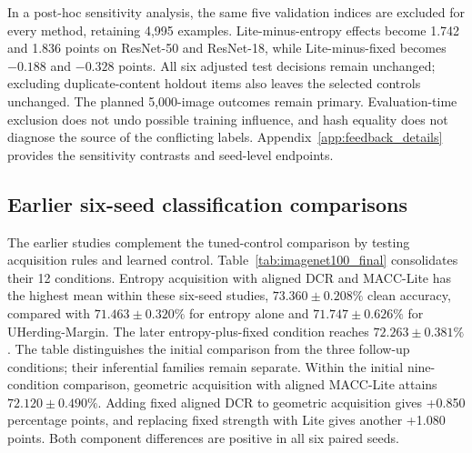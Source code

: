\documentclass[10pt,a4paper,twocolumn]{article}
\begin{document}
In a post-hoc sensitivity analysis, the same five validation indices
are excluded for every method, retaining 4,995 examples. Lite-minus-entropy
effects become 1.742 and 1.836 points on ResNet-50 and ResNet-18, while
Lite-minus-fixed becomes $-0.188$ and $-0.328$ points. All six adjusted
test decisions remain unchanged; excluding duplicate-content holdout
items also leaves the selected controls unchanged. The planned
5,000-image outcomes remain primary. Evaluation-time exclusion does not
undo possible training influence, and hash equality does not diagnose
the source of the conflicting labels. Appendix~\ref{app:feedback_details}
provides the sensitivity contrasts and seed-level endpoints.

\subsection{Earlier six-seed classification comparisons}\label{sec:initial_results}

The earlier studies complement the tuned-control comparison by testing
acquisition rules and learned control. Table~\ref{tab:imagenet100_final}
consolidates their 12 conditions. Entropy acquisition with aligned DCR
and MACC-Lite has the highest mean within these six-seed studies,
$73.360\pm0.208\%$ clean accuracy, compared with
$71.463\pm0.320\%$ for entropy alone and $71.747\pm0.626\%$ for
UHerding-Margin. The later entropy-plus-fixed condition reaches
$72.263\pm0.381\%$. The table distinguishes the initial comparison from
the three follow-up conditions; their inferential families remain separate.
Within the initial nine-condition comparison, geometric acquisition with
aligned MACC-Lite attains $72.120\pm0.490\%$. Adding fixed aligned DCR to
geometric acquisition gives +0.850 percentage points, and replacing fixed
strength with Lite gives another +1.080 points. Both component differences
are positive in all six paired seeds.
\end{document}
